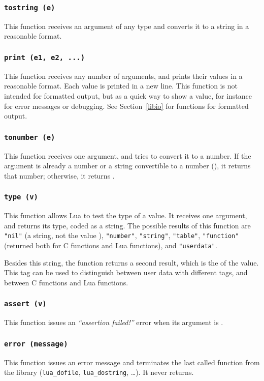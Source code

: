 \subsubsection*{{\tt tostring (e)}}
This function receives an argument of any type and
converts it to a string in a reasonable format.

\subsubsection*{{\tt print (e1, e2, ...)}}
This function receives any number of arguments,
and prints their values in a reasonable format.
Each value is printed in a new line.
This function is not intended for formatted output,
but as a quick way to show a value,
for instance for error messages or debugging.
See Section~\ref{libio} for functions for formatted output.

\subsubsection*{{\tt tonumber (e)}}
This function receives one argument,
and tries to convert it to a number.
If the argument is already a number or a string convertible
to a number (), it returns that number;
otherwise, it returns \nil.

\subsubsection*{{\tt type (v)}}
This function allows Lua to test the type of a value.
It receives one argument, and returns its type, coded as a string.
The possible results of this function are
\verb'"nil"' (a string, not the value \nil),
\verb'"number"',
\verb'"string"',
\verb'"table"',
\verb'"function"' (returned both for C functions and Lua functions),
and \verb'"userdata"'.

Besides this string, the function returns a second result,
which is the  of the value.
This tag can be used to distinguish between user
data with different tags,
and between C functions and Lua functions.

\subsubsection*{{\tt assert (v)}}
This function issues an {\em ``assertion failed!''} error
when its argument is \nil.

\subsubsection*{{\tt error (message)}}
This function issues an error message and terminates
the last called function from the library
(\verb'lua_dofile', \verb'lua_dostring', \ldots).
It never returns.

